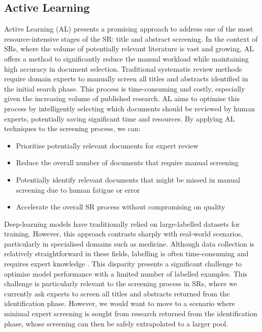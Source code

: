 \documentclass[../main.tex]{subfiles}
\begin{document}
\subsection{Active Learning}
Active Learning (AL) presents a promising approach to address one of the most resource-intensive stages of the SR: title and abstract screening. In the context of SRs, where the volume of potentially relevant literature is vast and growing, AL offers a method to significantly reduce the manual workload while maintaining high accuracy in document selection.
Traditional systematic review methods require domain experts to manually screen all titles and abstracts identified in the initial search phase. This process is time-consuming and costly, especially given the increasing volume of published research. AL aims to optimise this process by intelligently selecting which documents should be reviewed by human experts, potentially saving significant time and resources.
By applying AL techniques to the screening process, we can:
\begin{itemize}
    \item Prioritise potentially relevant documents for expert review
    \item Reduce the overall number of documents that require manual screening
    \item Potentially identify relevant documents that might be missed in manual screening due to human fatigue or error
    \item Accelerate the overall SR process without compromising on quality
\end{itemize}

Deep-learning models have traditionally relied on large-labelled datasets for training. However, this approach contrasts sharply with real-world scenarios, particularly in specialised domains such as medicine. Although data collection is relatively straightforward in these fields, labelling is often time-consuming and requires expert knowledge \cite{smith_less_2018, hoi_batch_2006}. This disparity presents a significant challenge to optimise model performance with a limited number of labelled examples. This challenge is particularly relevant to the screening process in SRs, where we currently ask experts to screen all titles and abstracts returned from the identification phase. However, we would want to move to a scenario where minimal expert screening is sought from research returned from the identification phase, whose screening can then be safely extrapolated to a larger pool.
\end{document}
